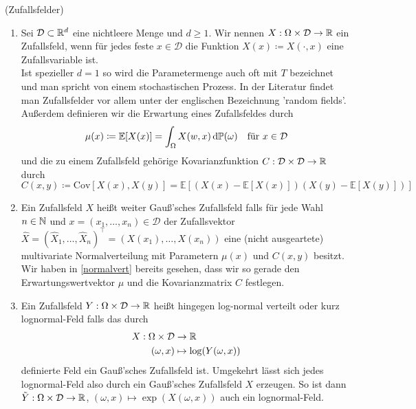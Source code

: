 \begin{Definition}(Zufallsfelder) 
	\label{randomFields}
	\begin{enumerate}[label=(\alph*)]
		\item Sei $ \mathcal{D} \subset \mathbb{R}^d  $ eine nichtleere Menge und $ d \geq 1$. Wir nennen $ X : \Omega \times \mathcal{D} \to \mathbb{R}$ ein Zufallsfeld, wenn für jedes feste $ x \in \mathcal{D} $ die Funktion $ X(x) \coloneqq X(\cdot,x) $ eine Zufallsvariable ist. \\
		Ist spezieller $ d=1 $ so wird die Parametermenge auch oft mit $ T $ bezeichnet und man spricht von einem stochastischen Prozess.
		In der Literatur findet man Zufallsfelder vor allem unter der englischen Bezeichnung 'random fields'. \\
		Außerdem definieren wir die Erwartung eines Zufallsfeldes durch
		\[
			\mu(x) \coloneqq \mathbb{E}[X(x)] = \int_{\Omega} X(w,x) \, \mathrm{d} \mathbb{P}(\omega)  \quad \text{für } x \in \mathcal{D}
		\]
		und die zu einem Zufallsfeld gehörige Kovarianzfunktion $ C: \mathcal{D} \times \mathcal{D} \to \mathbb{R} $ durch 
		\[
			C(x,y) \coloneqq \text{Cov}[X(x),X(y)] = \mathbb{E}\left[ \left(X(x)-\mathbb{E}[X(x)] \right) \left(X(y)-\mathbb{E}[X(y)]\right) \right]
		\]
		\item Ein Zufallsfeld $ X $ heißt weiter Gauß'sches Zufallsfeld falls für jede Wahl $ n \in \mathbb{N} $ und $ x = (x_1,\dots,x_n) \in \mathcal{D}$
		der Zufallsvektor $ \hat{X} = (\hat{X}_1,\dots,\hat{X}_n)^{\top} = (X(x_1),\dots,X(x_n)) $ eine (nicht ausgeartete) multivariate Normalverteilung mit Parametern $ \mu(x) $ und $ C(x,y) $ besitzt.
		Wir haben in \ref{normalvert} bereits gesehen, dass wir so gerade den Erwartungswertvektor $ \mu $ und die Kovarianzmatrix $ C $ festlegen.
		\item Ein Zufallsfeld $ Y: \Omega \times \mathcal{D} \to \mathbb{R} $ heißt hingegen log-normal verteilt oder kurz lognormal-Feld
		falls das durch 
		\begin{align*}
			X: \Omega \times \mathcal{D} &\to \mathbb{R}  \\ (\omega,x) &\mapsto \log(Y(\omega,x)) 
		\end{align*}
		 definierte Feld ein Gauß'sches Zufallsfeld ist.
		 Umgekehrt lässt sich jedes lognormal-Feld also durch ein Gauß'sches Zufallsfeld $ X  $ erzeugen. So ist dann $ \tilde{Y}:\Omega \times \mathcal{D} \to \mathbb{R} $, $  (\omega,x) \mapsto \exp(X(\omega,x)) $ auch ein lognormal-Feld.
		
	\end{enumerate}
\end{Definition}


